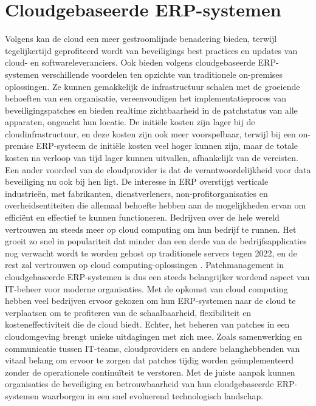 \section{Cloudgebaseerde ERP-systemen}
Volgens \textcite{Forbes2021} kan de cloud een meer gestroomlijnde benadering bieden, terwijl tegelijkertijd geprofiteerd wordt van beveiligings best practices en updates van cloud- en softwareleveranciers. Ook bieden volgens \textcite{Ruiter2024}
cloudgebaseerde ERP-systemen verschillende voordelen ten opzichte van traditionele on-premises oplossingen. Ze kunnen gemakkelijk de infrastructuur schalen met de groeiende behoeften van een organisatie, 
vereenvoudigen het implementatieproces van beveiligingspatches en bieden realtime zichtbaarheid in de patchstatus van alle apparaten, ongeacht hun locatie. De initiële kosten zijn lager bij de cloudinfrastructuur, en
deze kosten zijn ook meer voorspelbaar, terwijl bij een on-premise ERP-systeem de initiële kosten veel hoger kunnen zijn, maar de
totale kosten na verloop van tijd lager kunnen uitvallen, afhankelijk van de vereisten. Een ander voordeel van de cloudprovider is dat
de verantwoordelijkheid voor data beveiliging nu ook bij hen ligt. De interesse in ERP
overstijgt verticale industrieën, met fabrikanten, dienstverleners, non-profitorganisaties en overheidsentiteiten die allemaal behoefte hebben aan de mogelijkheden ervan om efficiënt en effectief te kunnen
functioneren. Bedrijven over de hele wereld vertrouwen nu steeds meer op cloud computing om hun bedrijf te runnen. Het groeit zo snel in populariteit dat minder dan een derde van de bedrijfsapplicaties nog verwacht wordt 
te worden gehost op traditionele servers tegen 2022, en de rest zal vertrouwen op cloud computing-oplossingen \autocite{Pimentel2017}.
Patchmanagement in cloudgebaseerde ERP-systemen is dus een steeds belangrijker wordend aspect van IT-beheer voor moderne organisaties. Met de opkomst van cloud computing hebben veel bedrijven ervoor gekozen
om hun ERP-systemen naar de cloud te verplaatsen om te profiteren van de schaalbaarheid, flexibiliteit en kosteneffectiviteit die de cloud biedt. 
Echter, het beheren van patches in een cloudomgeving brengt unieke uitdagingen met zich mee. Zoals samenwerking en communicatie tussen IT-teams, 
cloudproviders en andere belanghebbenden van vitaal belang om ervoor te zorgen dat patches tijdig worden geïmplementeerd zonder de 
operationele continuïteit te verstoren. Met de juiste aanpak kunnen organisaties de beveiliging en betrouwbaarheid van hun cloudgebaseerde ERP-systemen waarborgen in een snel evoluerend technologisch landschap.

